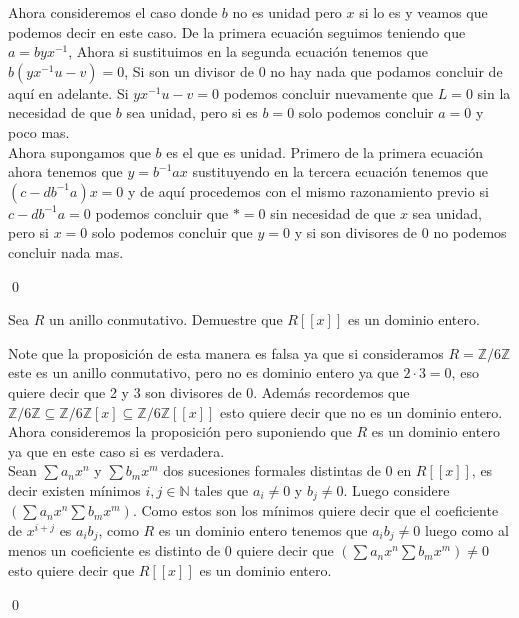 \begin{homeworkProblem}
\begin{solucion}
       Ahora consideremos el caso donde $b$ no es unidad pero $x$ si lo es y veamos que podemos decir en este caso. De la primera ecuación seguimos teniendo que $a=byx^{-1}$, Ahora si sustituimos en la segunda ecuación tenemos que $b(yx^{-1}u-v)=0$, Si son un divisor de $0$ no hay nada que podamos concluir de aquí en adelante. Si $yx^{-1}u-v=0$ podemos concluir nuevamente que $L=0$ sin la necesidad de que $b$ sea unidad, pero si es $b=0$ solo podemos concluir $a=0$ y poco mas.\\

       Ahora supongamos que $b$ es el que es unidad. Primero de la primera ecuación ahora tenemos que $y=b^{-1}ax$ sustituyendo en la tercera ecuación tenemos que $(c-db^{-1}a)x=0$ y de aquí procedemos con el mismo razonamiento previo si $c-db^{-1}a=0$ podemos concluir que $*=0$ sin necesidad de que $x$ sea unidad, pero si $x=0$ solo podemos concluir que $y=0$ y si son divisores de 0 no podemos concluir nada mas.

       \qed
   \end{solucion}
\end{homeworkProblem}
\newpage
\begin{homeworkProblem}
 Sea $R$ un anillo conmutativo. Demuestre que $R[[x]]$ es un dominio entero.
 \begin{solucion}
     Note que la proposición de esta manera es falsa ya que si consideramos $R=\mathbb{Z}/6\mathbb{Z}$ este es un anillo conmutativo, pero no es dominio entero ya que $2\cdot3=0$, eso quiere decir que 2 y 3 son divisores de 0. Además recordemos que $\mathbb{Z}/6\mathbb{Z}\subseteq\mathbb{Z}/6\mathbb{Z}[x]\subseteq\mathbb{Z}/6\mathbb{Z}[[x]]$ esto quiere decir que no es un dominio entero.\\
     Ahora consideremos la proposición pero suponiendo que $R$ es un dominio entero ya que en este caso si es verdadera.\\
     Sean $\sum a_nx^n$ y $\sum b_mx^m$ dos sucesiones formales distintas de $0$ en $R[[x]]$, es decir existen mínimos $i,j\in\mathbb{N}$ tales que $a_i\neq 0$ y $b_j\neq 0$. Luego considere $(\sum a_nx^n\sum b_mx^m)$. Como estos son los mínimos quiere decir que el coeficiente de $x^{i+j}$ es $a_ib_j$, como $R$ es un dominio entero tenemos que $a_ib_j\neq 0$ luego como al menos un coeficiente es distinto de 0 quiere decir que $(\sum a_nx^n\sum b_mx^m)\neq 0$ esto quiere decir que $R[[x]]$ es un dominio entero.
     
     \qed
 \end{solucion}
\end{homeworkProblem}

